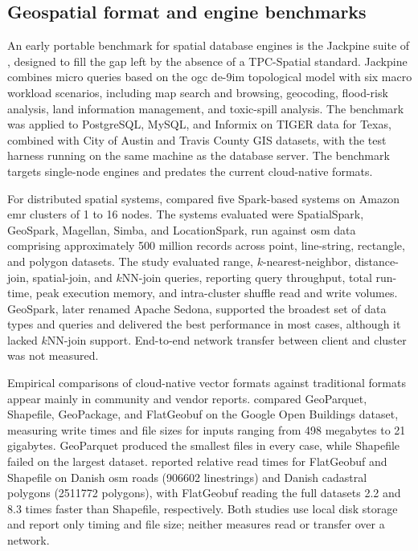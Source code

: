 \subsection{Geospatial format and engine benchmarks}
\label{related-work:geospatial-format-and-engine-benchmarks}

An early portable benchmark for spatial database engines is the Jackpine suite of \textcite{ray2011_jackpine_spatial_database_benchmark}, designed to fill the gap left by the absence of a TPC-Spatial standard. Jackpine combines micro queries based on the \acrshort{ogc} \acrfull{de-9im} topological model with six macro workload scenarios, including map search and browsing, geocoding, flood-risk analysis, land information management, and toxic-spill analysis. The benchmark was applied to PostgreSQL, MySQL, and Informix on TIGER data for Texas, combined with City of Austin and Travis County GIS datasets, with the test harness running on the same machine as the database server. The benchmark targets single-node engines and predates the current cloud-native formats.

For distributed spatial systems, \textcite{pandey2018_how_good_modern_spatial_analytics} compared five Spark-based systems on Amazon \acrshort{emr} clusters of \num{1} to \num{16} nodes. The systems evaluated were SpatialSpark, GeoSpark, Magellan, Simba, and LocationSpark, run against \acrfull{osm} data comprising approximately \num{500} million records across point, line-string, rectangle, and polygon datasets. The study evaluated range, $k$-nearest-neighbor, distance-join, spatial-join, and $k$NN-join queries, reporting query throughput, total run-time, peak execution memory, and intra-cluster shuffle read and write volumes. GeoSpark, later renamed Apache Sedona, supported the broadest set of data types and queries and delivered the best performance in most cases, although it lacked $k$NN-join support. End-to-end network transfer between client and cluster was not measured.

Empirical comparisons of cloud-native vector formats against traditional formats appear mainly in community and vendor reports. \textcite{holmes2023_geoparquet_performance} compared GeoParquet, Shapefile, GeoPackage, and FlatGeobuf on the Google Open Buildings dataset, measuring write times and file sizes for inputs ranging from \num{498} megabytes to \num{21} gigabytes. GeoParquet produced the smallest files in every case, while Shapefile failed on the largest dataset. \textcite{flatgeobuf2024_flatgeobuf_benchmarks} reported relative read times for FlatGeobuf and Shapefile on Danish \acrshort{osm} roads (\num{906602} linestrings) and Danish cadastral polygons (\num{2511772} polygons), with FlatGeobuf reading the full datasets \num{2.2} and \num{8.3} times faster than Shapefile, respectively. Both studies use local disk storage and report only timing and file size; neither measures read or transfer over a network.

